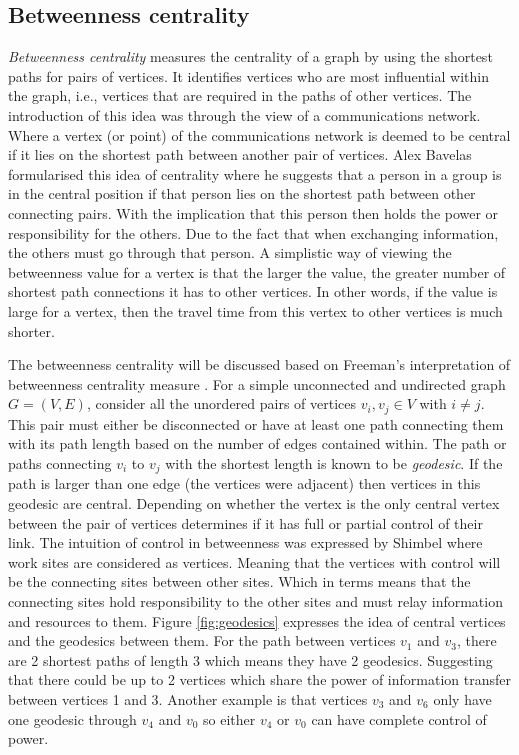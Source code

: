 \subsection{Betweenness centrality}
\emph{Betweenness centrality} measures the centrality of a graph by using the shortest paths for pairs of vertices. It identifies vertices who are most influential within the graph, i.e., vertices that are required in the paths of other vertices. The introduction of this idea was through the view of a communications network. Where a vertex (or point) of the communications network is deemed to be central if it lies on the shortest path between another pair of vertices. Alex Bavelas \cite{bavelas1948mathematical} formularised this idea of centrality where he suggests that a person in a group is in the central position if that person lies on the shortest path between other connecting pairs. With the implication that this person then holds the power or responsibility for the others. Due to the fact that when exchanging information, the others must go through that person. A simplistic way of viewing the betweenness value for a vertex is that the larger the value, the greater number of shortest path connections it has to other vertices. In other words, if the value is large for a vertex, then the travel time from this vertex to other vertices is much shorter. 

The betweenness centrality will be discussed based on Freeman's interpretation of betweenness centrality measure \cite{freeman1977set}. For a simple unconnected and undirected graph $G = (V, E)$, consider all the unordered pairs of vertices $v_i, v_j \in V$ with $i \ne j$. This pair must either be disconnected or have at least one path connecting them with its path length based on the number of edges contained within. The path or paths connecting $v_i$ to $v_j$ with the shortest length is known to be \emph{geodesic}. If the path is larger than one edge (the vertices were adjacent) then vertices in this geodesic are central. Depending on whether the vertex is the only central vertex between the pair of vertices determines if it has full or partial control of their link. The intuition of control in betweenness was expressed by Shimbel \cite{shimbel1953structural} where work sites are considered as vertices. Meaning that the vertices with control will be the connecting sites between other sites. Which in terms means that the connecting sites hold responsibility to the other sites and must relay information and resources to them. Figure \ref{fig:geodesics} expresses the idea of central vertices and the geodesics between them. For the path between vertices $v_1$ and $v_3$, there are 2 shortest paths of length 3 which means they have 2 geodesics. Suggesting that there could be up to 2 vertices which share the power of information transfer between vertices 1 and 3. Another example is that vertices $v_3$ and $v_6$ only have one geodesic through $v_4$ and $v_0$ so either $v_4$ or $v_0$ can have complete control of power.

